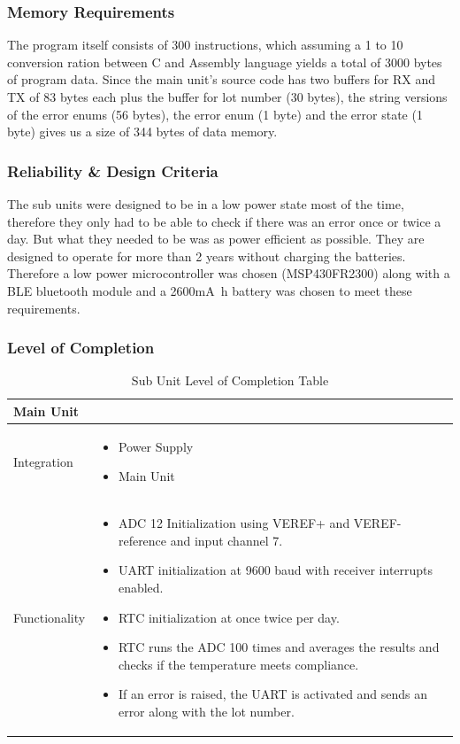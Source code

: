 \subsubsection{Memory Requirements}
The program itself consists of 300 instructions, which assuming a 1 to 10 conversion ration between C and Assembly language yields a total of 3000 bytes of program data. Since the main unit's source code has two buffers for RX and TX of 83 bytes each plus the buffer for lot number (30 bytes), the string versions of the error enums (56 bytes), the error enum (1 byte) and the error state (1 byte) gives us a size of 344 bytes of data memory.
\subsubsection{Reliability \& Design Criteria}
The sub units were designed to be in a low power state most of the time, therefore they only had to be able to check if there was an error once or twice a day. But what they needed to be was as power efficient as possible. They are designed to operate for more than 2 years without charging the batteries. Therefore a low power microcontroller was chosen (MSP430FR2300) along with a BLE bluetooth module and a 2600\si{\milli\ampere\hour} battery was chosen to meet these requirements.
\begin{landscape}
\subsubsection{Level of Completion}
  \begin{table}[!ht]
    \begin{tabularx}{\textwidth}{|X|X|}
      \hline
      \multicolumn{2}{|X|}{Main Unit}\\
      \hline
      Integration&\begin{itemize}
                    \item Power Supply
                    \item Main Unit
                  \end{itemize}\\
                  \hline
      Functionality&\begin{itemize}
          \item ADC 12 Initialization using VEREF+ and VEREF- reference and input channel 7.
          \item UART initialization at 9600 baud with receiver interrupts enabled.
          \item RTC initialization at once twice per day.
          \item RTC runs the ADC 100 times and averages the results and checks if the temperature meets compliance.
          \item If an error is raised, the UART is activated and sends an error along with the lot number.
        \end{itemize}\\
      \hline
    \end{tabularx}
    \caption{Sub Unit Level of Completion Table}
    \label{tab:sub-unit-completion-table}
  \end{table}
\end{landscape}
